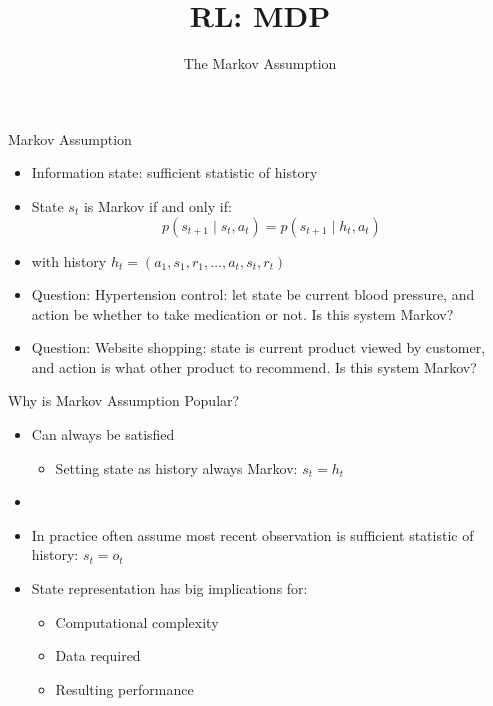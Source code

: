 


\title[Reinforcement Learning: Big Picture]{RL: MDP}
\subtitle{The Markov Assumption}




	
	\maketitle

\begin{frame}[c]{Markov Assumption}

\begin{itemize}
	\item Information state: sufficient statistic of history
	\item State $s_t$ is Markov if and only if:
	$$ p(s_{t+1} \mid s_t, a_t) = p(s_{t+1} \mid h_t, a_t)$$
	\item with history $h_t = (a_1, s_1, r_1, \ldots, a_t, s_t, r_t)$
	\pause
	\medskip
	\item \alert{Question:} Hypertension control: let state be current blood pressure, and action be whether to take medication or not. Is this system Markov?
	\item \alert{Question:} Website shopping: state is current product viewed by customer, and action is what other product to recommend. Is this system Markov?
\end{itemize}

\end{frame}
\begin{frame}[c]{Why is Markov Assumption Popular?}
	
	\begin{itemize}
		\item Can always be satisfied
		\begin{itemize}
			\item Setting state as history always Markov: $s_t = h_t$
		\end{itemize}
		\item \item In practice often assume most recent observation is sufficient statistic
		of history: $s_t = o_t$
		\item State representation has big implications for:
		\begin{itemize}
			\item Computational complexity
			\item Data required
			\item Resulting performance
		\end{itemize}
	\end{itemize}
	
\end{frame}



